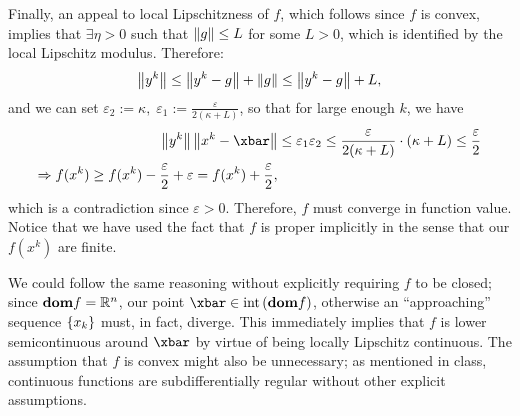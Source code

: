 \documentclass[10pt]{article}
\newcommand{\eps}{\varepsilon}
\begin{document}
\begin{Answer}
	Finally, an appeal to local Lipschitzness of $f$, which follows since $f$ is
	convex, implies that $\exists \eta > 0$ such that $ \leq L$ for
	some $L > 0$, which is identified by the local Lipschitz modulus.
	Therefore:
	\[
		\left \| y^k \right \| \leq \left \| y^k - g \right \| + \left \| g \right \| \leq \left \| y^k - g \right \| + L,
	\]
	and we can set $\eps_2 := \kappa, \; \eps_1 := \frac{\eps}{2 (\kappa + L)}$,
	so that for large enough $k$, we have
	\begin{align*}
		\norm{y^k} \norm{x^k - \xbar} &\leq \eps_1 \eps_2 \leq
		\frac{\eps}{2 (\kappa + L)} \cdot (\kappa + L) \leq \frac{\eps}{2} \\
		\Rightarrow f(x^k) \geq f(x^k) - \frac{\eps}{2} + \eps = f(x^k) +
		\frac{\eps}{2},
	\end{align*}
	which is a contradiction since $\eps > 0$. Therefore, $f$ must converge in
	function value. Notice that we have used the fact that $f$ is proper
	implicitly in the sense that our $f(x^k)$ are finite.

	We could follow the same reasoning without explicitly requiring $f$ to be
	closed; since $\dom f = \Rbb^n$, our point $\xbar \in {}$, otherwise an
	``approaching'' sequence $$ must, in fact, diverge. This
	immediately implies that $f$ is lower semicontinuous around $\xbar$ by
	virtue of being locally Lipschitz continuous. The assumption that $f$ is
	convex might also be unnecessary; as mentioned in class, continuous
	functions are  subdifferentially regular without other explicit assumptions.
\end{Answer}
\end{document}
